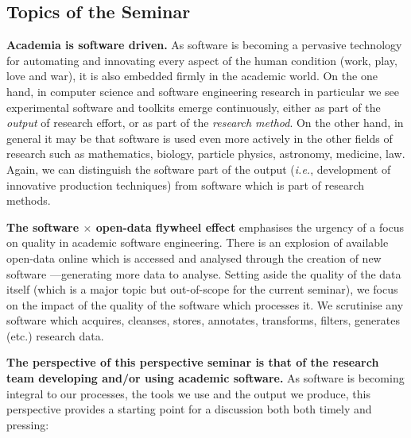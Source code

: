 \documentclass[a4paper,UKenglish]{dagman}
\renewcommand{\paragraph}[1]{{\bf #1}\xspace}
\newcommand{\ie}{\emph{i.e.},\xspace}
\begin{document}
\subsection*{Topics of the Seminar}

\paragraph{Academia is software driven.} As software is becoming a pervasive technology for automating and innovating every aspect of the human condition (work, play, love and war), it is also embedded firmly in the academic world. On the one hand, in computer science and software engineering research in particular we see experimental software and toolkits emerge continuously, either as part of the \emph{output} of research effort, or as part of the \emph{research method}. On the other hand, in general it may be that software is used even more actively in the other fields of research such as mathematics, biology, particle physics, astronomy, medicine, law. Again, we can distinguish the software part of the output (\ie development of innovative production techniques) from software which is part of research methods. 

\paragraph{The software $\times$ open-data flywheel effect} emphasises the urgency of a focus on quality in academic software engineering. There is an explosion of available open-data online which is accessed and analysed through the creation of new software ---generating more data to analyse. Setting aside the quality of the data itself (which is a major topic but out-of-scope for the current seminar), we focus on the impact of the quality of the software which processes it. We scrutinise any software which acquires, cleanses, stores, annotates, transforms, filters, generates (etc.) research data.

\paragraph{The perspective of this perspective seminar is that of the research team developing and/or using academic software.} As software is becoming integral to our processes, the tools we use and the output we produce, this perspective provides a starting point for a discussion both both timely and pressing:
\end{document}

